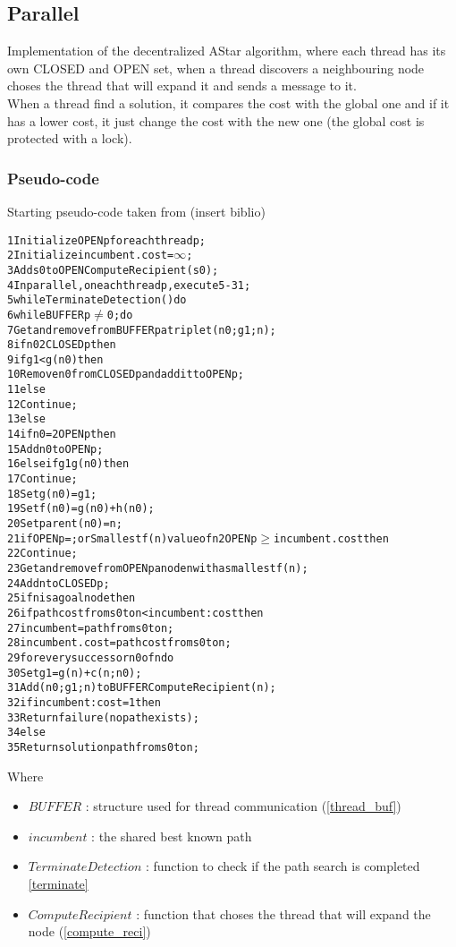\subsection{Parallel}

Implementation of the decentralized AStar algorithm, where each thread has its own CLOSED and OPEN set, when a thread discovers a neighbouring node choses the thread that will expand it and sends a message to it.
\\
When a thread find a solution, it compares the cost with the global one and if it has a lower cost, it just change the cost with the new one (the global cost is protected with a lock).

\subsubsection{Pseudo-code}

Starting pseudo-code taken from (insert biblio)

\begin{alltt}
    1 Initialize OPENp for each thread p;
    2 Initialize incumbent.cost = \(\infty\);
    3 Add s0 to OPENComputeRecipient(s0);
    4 In parallel, on each thread p, execute 5-31;
    5 while TerminateDetection() do
    6   while BUFFERp \(\neq\) 0 ; do
    7       Get and remove from BUFFERp a triplet (n0; g1; n);
    8       if n0 2 CLOSEDp then
    9           if g1 < g(n0) then
    10              Remove n0 from CLOSEDp and add it to OPENp;
    11             else
    12                  Continue;
    13      else
    14          if n0 =2 OPENp then
    15              Add n0 to OPENp;
    16          else if g1  g(n0) then
    17              Continue;
    18      Set g(n0) = g1;
    19      Set f(n0) = g(n0) + h(n0);
    20      Set parent(n0) = n;
    21  if OPENp = ; or Smallest f(n) value of n 2 OPENp \(\geq\) incumbent.cost then
    22      Continue;
    23  Get and remove from OPENp a node n with a smallest f(n);
    24  Add n to CLOSEDp;
    25  if n is a goal node then
    26      if path cost from s0 to n < incumbent:cost then
    27          incumbent = path from s0 to n;
    28          incumbent.cost = path cost from s0 to n;
    29  for every successor n0 of n do
    30      Set g1 = g(n) + c(n; n0);
    31      Add (n0; g1; n) to BUFFER ComputeRecipient(n);
    32 if incumbent:cost = 1 then
    33  Return failure (no path exists);
    34 else
    35  Return solution path from s0 to n;
\end{alltt}

Where
\begin{itemize}
    \item $BUFFER$ : structure used for thread communication (\ref{thread_buf})
    \item $incumbent$ : the shared best known path
    \item $TerminateDetection$ : function to check if the path search is completed \ref{terminate}
    \item $ComputeRecipient$ : function that choses the thread that will expand the node (\ref{compute_reci})
\end{itemize}

